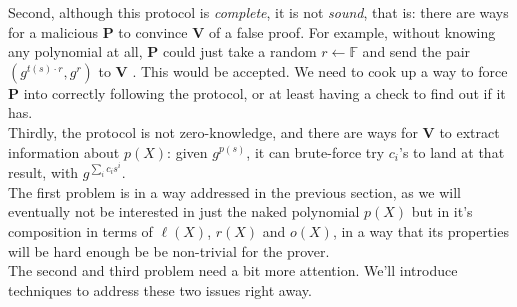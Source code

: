 \documentclass[11pt,oneside]{article}
\newcommand{\bP}{\textbf{P} }
\newcommand{\bV}{\textbf{V} }
\theoremstyle{definition}
\theoremstyle{remark}
\numberwithin{equation}{section}
\begin{document}
Second, although this protocol is \emph{complete}, it is not \emph{sound}, that is: there are ways for a malicious \bP to convince \bV of a false proof. For example, without knowing any polynomial at all, \bP could just take a random $r\leftarrow \mathbb{F}$ and send the pair $(g^{t(s)\cdot r},g^r)$ to \bV. This would be accepted. We need to cook up a way to force \bP into correctly following the protocol, or at least having a check to find out if it has.\\
Thirdly, the protocol is not zero-knowledge, and there are ways for \bV to extract information about $p(X)$: given $g^{p(s)}$, it can brute-force try $c_i$'s to land at that result, with $g^{\sum_{i}c_is^i}$.\\
The first problem is in a way addressed in the previous section, as we will eventually not be interested in just the naked polynomial $p(X)$ but in it's composition in terms of $\ell(X)$, $r(X)$ and $o(X)$, in a way that its properties will be hard enough be be non-trivial for the prover.\\
The second and third problem need a bit more attention. We'll introduce techniques to address these two issues right away.
\newline
\end{document}
